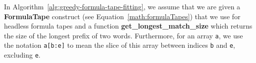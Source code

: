 \begin{remark}
    In Algorithm~\ref{alg:greedy-formula-tape-fitting}, we assume that we are given a \textbf{FormulaTape} construct (see Equation~\eqref{math:formulaTapes}) that we use for headless formula tapes and a function \textbf{get\_longest\_match\_size} which returns the size of the longest prefix of two words. Furthermore, for an array \texttt{a}, we use the notation \texttt{a[b:e]} to mean the slice of this array between indices \texttt{b} and \texttt{e}, excluding \texttt{e}.
\end{remark}






